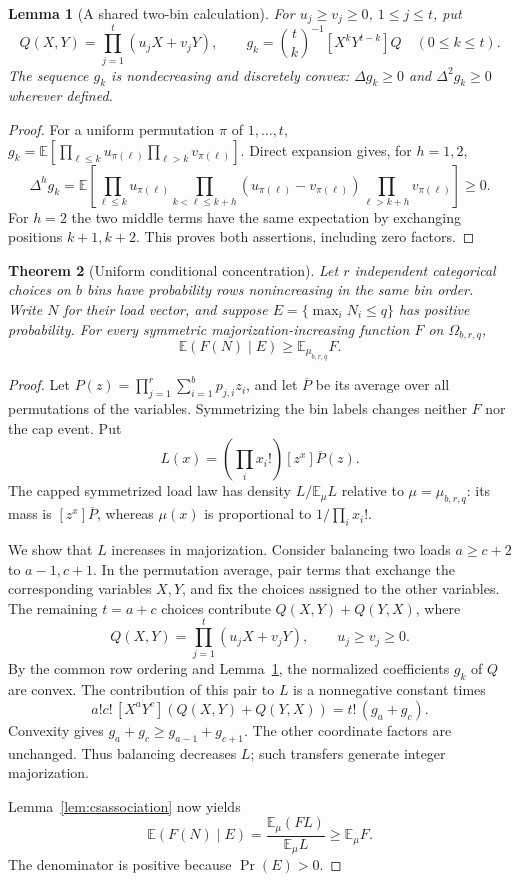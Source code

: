 \documentclass[11pt]{article}
\newtheorem{theorem}{Theorem}
\newtheorem{lemma}[theorem]{Lemma}
\begin{document}
\begin{lemma}[A shared two-bin calculation]\label{lem:pairmeans}
For $u_j\geq v_j\geq0$, $1\leq j\leq t$, put
\[
 Q(X,Y)=\prod_{j=1}^t(u_jX+v_jY),\qquad
 g_k=\binom tk^{-1}[X^kY^{t-k}]Q\quad(0\leq k\leq t).
\]
The sequence $g_k$ is nondecreasing and discretely convex:
$\Delta g_k\geq0$ and $\Delta^2g_k\geq0$ wherever defined.
\end{lemma}
\begin{proof}
For a uniform permutation $\pi$ of $1,\ldots,t$,
$g_k=\mathbb E[\prod_{\ell\leq k}u_{\pi(\ell)}
\prod_{\ell>k}v_{\pi(\ell)}]$. Direct expansion gives, for $h=1,2$,
\[
 \Delta^h g_k=\mathbb E\left[
 \prod_{\ell\leq k}u_{\pi(\ell)}
 \prod_{k<\ell\leq k+h}(u_{\pi(\ell)}-v_{\pi(\ell)})
 \prod_{\ell>k+h}v_{\pi(\ell)}\right]\geq0.
\]
For $h=2$ the two middle terms have the same expectation by exchanging
positions $k+1,k+2$. This proves both assertions, including zero factors.
\end{proof}

\begin{theorem}[Uniform conditional concentration]\label{thm:allconcentration}
Let $r$ independent categorical choices on $b$ bins have probability
rows nonincreasing in the same bin order. Write $N$ for their load vector,
and suppose $E=\{\max_iN_i\leq q\}$ has positive probability.
For every symmetric majorization-increasing function $F$ on
$\Omega_{b,r,q}$,
\[
 \mathbb E(F(N)\mid E)\geq\mathbb E_{\mu_{b,r,q}}F.
\]
\end{theorem}
\begin{proof}
Let $P(z)=\prod_{j=1}^r\sum_{i=1}^b p_{j,i}z_i$, and let
$\overline P$ be its average over all permutations of the variables.
Symmetrizing the bin labels changes neither $F$ nor the cap event.
Put
\[
 L(x)=\left(\prod_i x_i!\right)[z^x]\overline P(z).
\]
The capped symmetrized load law has density $L/\mathbb E_\mu L$
relative to $\mu=\mu_{b,r,q}$: its mass is $[z^x]\overline P$,
whereas $\mu(x)$ is proportional to $1/\prod_i x_i!$.

We show that $L$ increases in majorization. Consider balancing two
loads $a\geq c+2$ to $a-1,c+1$. In the permutation average, pair
terms that exchange the corresponding variables $X,Y$, and fix the
choices assigned to the other variables. The remaining $t=a+c$
choices contribute $Q(X,Y)+Q(Y,X)$, where
\[
 Q(X,Y)=\prod_{j=1}^t(u_jX+v_jY),\qquad u_j\geq v_j\geq0.
\]
By the common row ordering and Lemma~\ref{lem:pairmeans}, the
normalized coefficients $g_k$ of $Q$ are convex. The contribution
of this pair to $L$ is a nonnegative constant times
\[
 a!c!\,[X^aY^c](Q(X,Y)+Q(Y,X))=t!\,(g_a+g_c).
\]
Convexity gives $g_a+g_c\geq g_{a-1}+g_{c+1}$. The other
coordinate factors are unchanged. Thus balancing decreases $L$;
such transfers generate integer majorization.

Lemma~\ref{lem:csassociation} now yields
\[
 \mathbb E(F(N)\mid E)
   =\frac{\mathbb E_\mu(FL)}{\mathbb E_\mu L}
   \geq\mathbb E_\mu F.
\]
The denominator is positive because $\Pr(E)>0$.
\end{proof}
\end{document}
